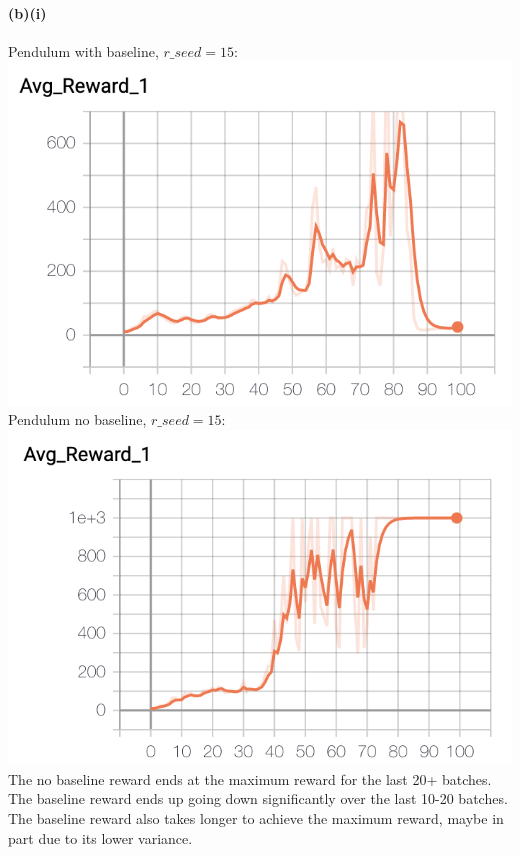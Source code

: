 \documentclass[10pt,a4paper]{article}
\begin{document}
  \paragraph{(b)(i)}  
  Pendulum with baseline, $r\_seed=15$: \\
  \includegraphics[scale=0.5]{images/pendulum_baseline_15_avg_reward.png} \\
  Pendulum no baseline, $r\_seed=15$: \\
  \includegraphics[scale=0.5]{images/pendulum_nobaseline_15_avg_reward.png} \\
  The no baseline reward ends at the maximum reward for the last 20+ batches.  The baseline reward ends up going down significantly over the last 10-20 batches.  The baseline reward also takes longer to achieve the maximum reward, maybe in part due to its lower variance.
\end{document}

